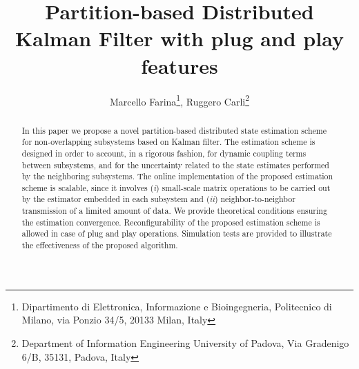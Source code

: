 \documentclass[journal,10pt,draftcls,onecolumn]{IEEEtran}
\title{Partition-based Distributed Kalman Filter with plug and play features}
\author{Marcello Farina\thanks{Dipartimento di Elettronica, Informazione e Bioingegneria, Politecnico di Milano, via Ponzio 34/5, 20133 Milan, Italy}, Ruggero Carli\thanks{Department of Information Engineering University of Padova, Via Gradenigo 6/B, 35131, Padova, Italy} }
\begin{document}
\maketitle

\begin{abstract}                          In this paper we propose a novel partition-based distributed state estimation scheme for non-overlapping subsystems based on Kalman filter. The estimation scheme is designed in order to account, in a rigorous fashion, for dynamic coupling terms between subsystems, and for the uncertainty related to the state estimates performed by the neighboring subsystems. The online implementation of the proposed estimation scheme is scalable, since it involves (\emph{i}) small-scale matrix operations to be carried out by the estimator embedded in each subsystem and (\emph{ii}) neighbor-to-neighbor transmission of a limited amount of data. We provide theoretical conditions ensuring the estimation convergence. Reconfigurability of the proposed estimation scheme is allowed in case of plug and play operations. Simulation tests are provided to illustrate the effectiveness of the proposed algorithm.
\end{abstract}
\end{document}
